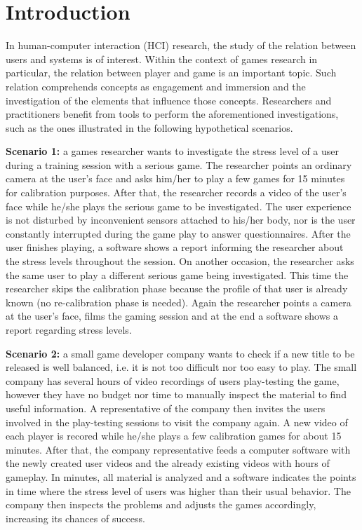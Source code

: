 \chapter{Introduction}
\label{c:introduction}

In human-computer interaction (HCI) research, the study of the relation between users and systems is of interest. Within the context of games research in particular, the relation between player and game is an important topic. Such relation comprehends concepts as engagement and immersion \parencite{boyle2012engagement} and the investigation of the elements that influence those concepts. Researchers and practitioners benefit from tools to perform the aforementioned investigations, such as the ones illustrated in the following hypothetical scenarios.

\textbf{Scenario 1:} a games researcher wants to investigate the stress level of a user during a training session with a serious game. The researcher points an ordinary camera at the user's face and asks him/her to play a few games for 15 minutes for calibration purposes. After that, the researcher records a video of the user's face while he/she plays the serious game to be investigated. The user experience is not disturbed by inconvenient sensors attached to his/her body, nor is the user constantly interrupted during the game play to answer questionnaires. After the user finishes playing, a software shows a report informing the researcher about the stress levels throughout the session. On another occasion, the researcher asks the same user to play a different serious game being investigated. This time the researcher skips the calibration phase because the profile of that user is already known (no re-calibration phase is needed). Again the researcher points a camera at the user's face, films the gaming session and at the end a software shows a report regarding stress levels.

\textbf{Scenario 2:} a small game developer company wants to check if a new title to be released is well balanced, i.e. it is not too difficult nor too easy to play. The small company has several hours of video recordings of users play-testing the game, however they have no budget nor time to manually inspect the material to find useful information. A representative of the company then invites the users involved in the play-testing sessions to visit the company again. A new video of each player is recored while he/she plays a few calibration games for about 15 minutes. After that, the company representative feeds a computer software with the newly created user videos and the already existing videos with hours of gameplay. In minutes, all material is analyzed and a software indicates the points in time where the stress level of users was higher than their usual behavior. The company then inspects the problems and adjusts the games accordingly, increasing its chances of success.

